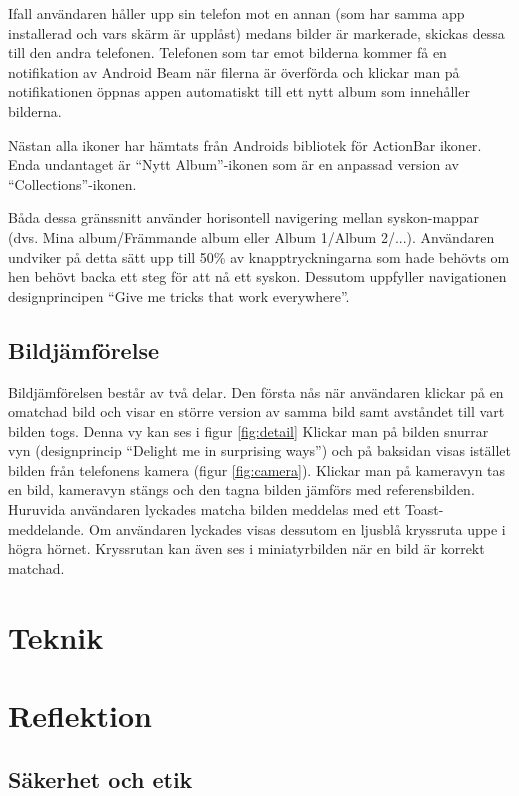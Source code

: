 \documentclass[11px, a4paper]{article}
\begin{document}
	Ifall användaren håller upp sin telefon mot en annan (som har samma app installerad och vars skärm är upplåst) medans bilder är markerade, skickas dessa till den andra telefonen. Telefonen som tar emot bilderna kommer få en notifikation av Android Beam när filerna är överförda och klickar man på notifikationen öppnas appen automatiskt till ett nytt album som innehåller bilderna.

	Nästan alla ikoner har hämtats från Androids bibliotek för ActionBar ikoner\cite{Icons}. Enda undantaget är ``Nytt Album''-ikonen som är en anpassad version av ``Collections''-ikonen.

	Båda dessa gränssnitt använder horisontell navigering mellan syskon-mappar (dvs. Mina album/Främmande album eller Album 1/Album 2/...). Användaren undviker på detta sätt upp till 50\% av knapptryckningarna som hade behövts om hen behövt backa ett steg för att nå ett syskon. Dessutom uppfyller navigationen designprincipen ``Give me tricks that work everywhere''\cite{Principles}.



\subsection{Bildjämförelse}
	Bildjämförelsen består av två delar. Den första nås när användaren klickar på en omatchad bild och visar en större version av samma bild samt avståndet till vart bilden togs. Denna vy kan ses i figur \ref{fig:detail} Klickar man på bilden snurrar vyn (designprincip ``Delight me in surprising ways''\cite{Principles}) och på baksidan visas istället bilden från telefonens kamera (figur \ref{fig:camera}). Klickar man på kameravyn tas en bild, kameravyn stängs och den tagna bilden jämförs med referensbilden. Huruvida användaren lyckades matcha bilden meddelas med ett Toast-meddelande. Om användaren lyckades visas dessutom en ljusblå kryssruta uppe i högra hörnet. Kryssrutan kan även ses i miniatyrbilden när en bild är korrekt matchad.


\section{Teknik}


\section{Reflektion}

\subsection{Säkerhet och etik}



\begingroup
\raggedright


\endgroup
\end{document}
